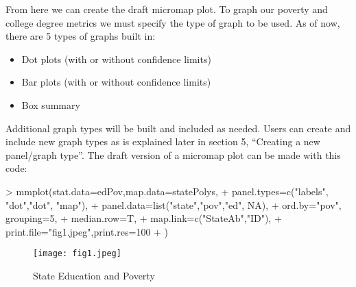 \documentclass{article}
\begin{document}
From here we can create the draft micromap plot. To graph our poverty and college degree metrics we must specify the type of graph to be used. As of now, there are 5 types of graphs built in:

\begin{itemize}
  \item Dot plots (with or without confidence limits)
  \item Bar plots (with or without confidence limits)
  \item Box summary
\end{itemize}

Additional graph types will be built and included as needed. Users can create and include new graph types as is explained later in section 5, ``Creating a new panel/graph type''. The draft version of a micromap plot can be made with this code:

\begin{Schunk}
\begin{Sinput}
> mmplot(stat.data=edPov,map.data=statePolys,
+   panel.types=c("labels", "dot","dot", "map"),
+   panel.data=list("state","pov","ed", NA),
+   ord.by="pov", grouping=5,
+   median.row=T,
+   map.link=c("StateAb","ID"),
+   print.file="fig1.jpeg",print.res=100
+ ) 
\end{Sinput}
\end{Schunk}

\begin{figure}
\begin{center}
\texttt{[image: fig1.jpeg]} 
  \caption{State Education and Poverty} 
  \label{fig1}
\end{center}
\end{figure}
\end{document}
